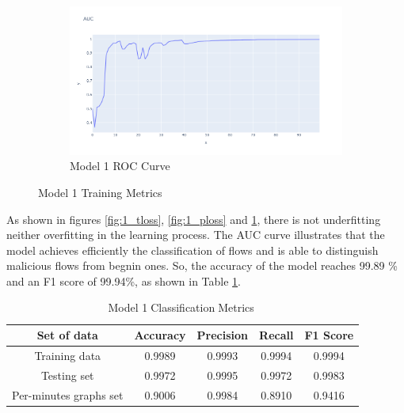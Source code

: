 \begin{figure}[H]
\begin{subfigure}{0.45\textwidth}
        \centering
        \includegraphics[width=\linewidth]{figures/ev/1_auc.png}
        \caption{Model 1 ROC Curve}
    \label{fig:1_auc}
    \end{subfigure}
\caption{Model 1 Training Metrics}
 \label{fig:1_tr}
\end{figure}
 As shown in figures \ref{fig:1_tloss}, \ref{fig:1_ploss} and \ref{fig:1_auc}, there is not underfitting neither overfitting in the learning process. The AUC curve illustrates that the model achieves efficiently the classification of flows and is able to distinguish  malicious flows from begnin ones. So, the accuracy of the model reaches 99.89 \% and an F1 score of 99.94\%, as shown in Table \ref{M1_tab}. 
 \begin{table}[H]%
\centering
\begin{tabular}{|c|c|c|c|c|}
\hline
Set of data & Accuracy & Precision & Recall & F1 Score \\
\hline
Training data & 0.9989 & 0.9993 & 0.9994 & 0.9994 \\
\hline
Testing set & 0.9972 & 0.9995 & 0.9972 & 0.9983 \\
\hline
Per-minutes graphs set & 0.9006 & 0.9984 & 0.8910 & 0.9416 \\
\hline
\end{tabular}
\caption{Model 1\textcolor{white}{.}Classification\textcolor{white}{.}Metrics\textcolor{white}{.} }
\label{M1_tab}
\end{table}
